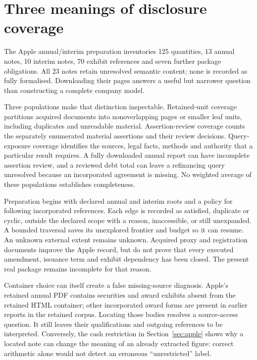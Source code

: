 \section{Three meanings of disclosure coverage}

The Apple annual/interim preparation inventories 125 quantities, 13 annual notes,
10 interim notes, 70 exhibit references and seven further package obligations.
All 23 notes retain unresolved semantic content; none is recorded as fully
formalised. Downloading their pages answers a useful but narrower question
than constructing a complete company model.

Three populations make that distinction inspectable. Retained-unit coverage
partitions acquired documents into nonoverlapping pages or smaller leaf units,
including duplicates and unreadable material. Assertion-review coverage counts
the separately enumerated material assertions and their review decisions.
Query-exposure coverage identifies the sources, legal facts, methods and
authority that a particular result requires. A fully downloaded annual report
can have incomplete assertion review, and a reviewed debt total can leave a
refinancing query unresolved because an incorporated agreement is missing.
No weighted average of these populations establishes completeness.

Preparation begins with declared annual and interim roots and a policy for
following incorporated references. Each edge is recorded as satisfied,
duplicate or cyclic, outside the declared scope with a reason, inaccessible,
or still unexpanded. A bounded traversal saves its unexplored frontier and
budget so it can resume. An unknown external extent remains unknown. Acquired
proxy and registration documents improve the Apple record, but do not prove
that every executed amendment, issuance term and exhibit dependency has been
closed. The present real package remains incomplete for that reason.

Container choice can itself create a false missing-source diagnosis. Apple's
retained annual PDF contains securities and award exhibits absent from the
retained HTML container; other incorporated award forms are present in earlier
reports in the retained corpus. Locating those bodies resolves a source-access
question. It still leaves their qualifications and outgoing references to be
interpreted. Conversely, the cash restriction in Section~\ref{sec:apple} shows
why a located note can change the meaning of an already extracted figure:
correct arithmetic alone would not detect an erroneous ``unrestricted'' label.

